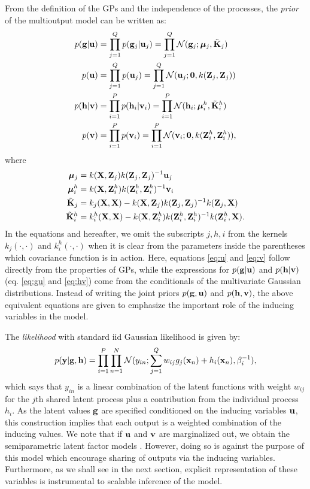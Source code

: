From the definition of the GPs and the independence of the processes, the \emph{prior} of the multioutput model can be written as:
\begin{align}
\label{eq:gu}
p(\mathbf{g} | \mathbf{u}) &= \prod_{j=1}^Q p(\mathbf{g}_j | \mathbf{u}_j) = \prod_{j=1}^Q \mathcal{N}(\mathbf{g}_j; \boldsymbol{\mu}_j, \tilde{\mathbf{K}}_j )\\
\label{eq:u}
p(\mathbf{u}) &= \prod_{j=1}^Q p(\mathbf{u}_j) = \prod_{j=1}^Q \mathcal{N}(\mathbf{u}_j; \mathbf{0}, k(\mathbf{Z}_j, \mathbf{Z}_j)) \\
\label{eq:hv}
p(\mathbf{h} | \mathbf{v}) &= \prod_{i=1}^P p(\mathbf{h}_i | \mathbf{v}_i) = \prod_{i=1}^P \mathcal{N}(\mathbf{h}_i; \boldsymbol{\mu}^h_i, \tilde{\mathbf{K}}^h_i)\\
\label{eq:v}
p(\mathbf{v}) &= \prod_{i=1}^P p(\mathbf{v}_i) = \prod_{i=1}^P \mathcal{N}(\mathbf{v}_i; \mathbf{0}, k(\mathbf{Z}^h_i, \mathbf{Z}^h_i)),
\end{align}
where
\begin{align}
 \boldsymbol{\mu}_j &= k(\mathbf{X},\mathbf{Z}_j)k(\mathbf{Z}_j,\mathbf{Z}_j)^{-1}\mathbf{u}_j \\
\boldsymbol{\mu}^h_i &= k(\mathbf{X},\mathbf{Z}^h_i)k(\mathbf{Z}^h_i,\mathbf{Z}^h_i)^{-1}\mathbf{v}_i \\
\tilde{\mathbf{K}}_j &= k_j(\mathbf{X},\mathbf{X}) - k(\mathbf{X},\mathbf{Z}_j)k(\mathbf{Z}_j,\mathbf{Z}_j)^{-1}k(\mathbf{Z}_j,\mathbf{X}) \\
\tilde{\mathbf{K}}^h_i &= k^h_i(\mathbf{X},\mathbf{X}) - k(\mathbf{X},\mathbf{Z}^h_i)k(\mathbf{Z}^h_i,\mathbf{Z}^h_i)^{-1}k(\mathbf{Z}^h_i,\mathbf{X}).
\end{align}
In the equations and hereafter, we omit the subscripts $j,h,i$ from the kernels $k_j(\cdot,\cdot)$ and $k^h_i(\cdot,\cdot)$ when it is clear from the parameters inside the parentheses which covariance function is in action.
Here, equations \ref{eq:u} and \ref{eq:v} follow directly from the properties of GPs, while the expressions for $p(\mathbf{g}|\mathbf{u})$ and $p(\mathbf{h}|\mathbf{v})$ (eq. \ref{eq:gu} and \ref{eq:hv}) come from the conditionals of the multivariate Gaussian distributions.
Instead of writing the joint priors $p(\mathbf{g},\mathbf{u})$ and $p(\mathbf{h},\mathbf{v})$, the above equivalent equations are given to emphasize the important role of the inducing variables in the model.

The \emph{likelihood} with standard iid Gaussian likelihood is given by:
\begin{align}
p(\mathbf{y} | \mathbf{g}, \mathbf{h} ) = \prod_{i=1}^P \prod_{n=1}^N \mathcal{N}( y_{in} ; \sum_{j=1}^Q w_{ij} g_j(\mathbf{x}_n) + h_i(\mathbf{x}_n), \beta_i^{-1}),
\end{align}
which says that $y_{in}$ is a linear combination of the latent functions with weight $w_{ij}$ for the $j$th shared latent process plus a contribution from the individual process $h_i$.
As the latent values $\mathbf{g}$ are specified conditioned on the inducing variables $\mathbf{u}$, this construction implies that each output is a weighted combination of the inducing values.
We note that if $\mathbf{u}$ and $\mathbf{v}$ are marginalized out, we obtain the semiparametric latent factor models \citep{teh-et-al-aistats-05}.
However, doing so is against the purpose of this model which encourage sharing of outputs via the inducing variables.
Furthermore, as we shall see in the next section, explicit representation of these variables is instrumental to scalable inference of the model.

